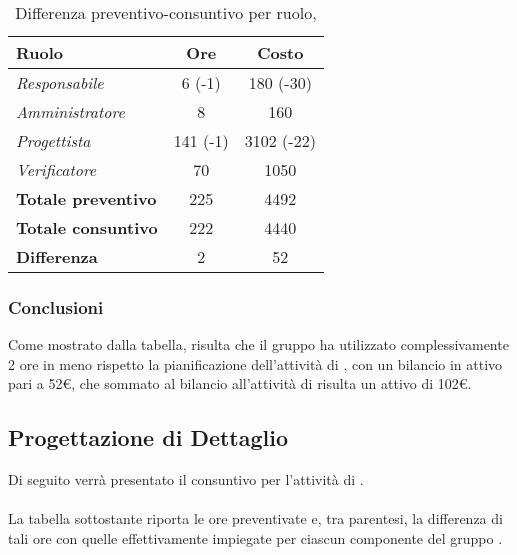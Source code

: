 \begin{table}[H]
	\begin{center}
		\begin{tabular}{|l|c|c|}
			\hline
			\textbf{Ruolo}	& \textbf{Ore} & \textbf{Costo} \\
			\hline
			\textit{Responsabile}		&	6 (-1)	&	180 (-30) 	\\
			\hline
			\textit{Amministratore}		&	8		&	160			\\
			\hline
			\textit{Progettista}		&	141 (-1)&	3102 (-22) 	\\
			\hline
			\textit{Verificatore}		&	70 		&	1050 		\\
			\hline
			\textbf{Totale preventivo}	&	225		& 	4492		\\
			\hline
			\textbf{Totale consuntivo}	&	222		&  	4440		\\
			\hline
			\textbf{Differenza} 		&	2		&	52			\\
			\hline
		\end{tabular}
	\end{center}
	\caption{Differenza preventivo-consuntivo per ruolo, \PA}
\end{table}

\subsubsection{Conclusioni}

Come mostrato dalla tabella, risulta che il gruppo ha utilizzato complessivamente 2 ore in meno rispetto la pianificazione dell'attività di \textit{\PA}, con un bilancio in attivo pari a 52€, che sommato al bilancio all'attività di \textit{\AR} risulta un attivo di 102€.

\subsection{Progettazione di Dettaglio}
Di seguito verrà presentato il consuntivo per l'attività di \textit{\PD}.
\\\\
La tabella sottostante riporta le ore preventivate e, tra parentesi, la differenza di tali ore con quelle effettivamente impiegate per ciascun componente del gruppo \gruppo.

